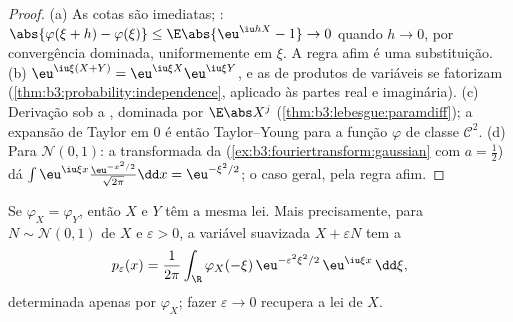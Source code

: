 \begin{proof}
(a) As cotas são imediatas; : $\abs{\varphi(\xi + h)
- \varphi(\xi)} \leq \E\abs{\eu^{\iu hX} - 1} \to 0$ quando $h
\to 0$, por
convergência dominada, uniformemente em $\xi$. A regra afim é uma
substituição. (b) $\eu^{\iu\xi(X+Y)} =
\eu^{\iu\xi X}\eu^{\iu\xi Y}$, e as  de produtos de variáveis
 se fatorizam (\cref{thm:b3:probability:independence}, aplicado às partes real e
imaginária). (c) Derivação sob a , dominada por $\E\abs X^j$
(\cref{thm:b3:lebesgue:paramdiff}); a expansão de Taylor em $0$ é então
Taylor--Young para a função $\varphi$ de classe $\mathcal C^2$. (d) Para $\mathcal N(0,1)$: a
transformada da  (\cref{ex:b3:fouriertransform:gaussian} com $a = \frac12$) dá $\int\eu^{\iu\xi x}\frac{\eu^{-x^2/2}}{\sqrt{2\pi}}\dd
x = \eu^{-\xi^2/2}$; o caso geral,
pela regra afim.
\end{proof}

\begin{theorem}[Injetividade]\label{thm:b3:clt:injectivity}
Se $\varphi_X = \varphi_Y$, então $X$ e $Y$ têm a mesma lei. Mais precisamente, para
$N \sim \mathcal N(0,1)$  de $X$ e $\varepsilon > 0$, a variável suavizada $X +
\varepsilon N$ tem a
\[
p_\varepsilon(x) = \frac1{2\pi}\int_\R
\varphi_X(-\xi)\,\eu^{-\varepsilon^2\xi^2/2}\,
\eu^{\iu\xi x}\,\dd\xi ,
\]
determinada apenas por $\varphi_X$; fazer $\varepsilon \to 0$ recupera a lei de
$X$.
\end{theorem}

